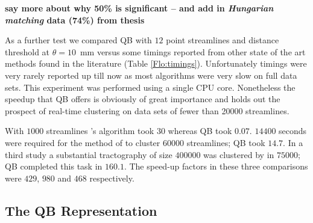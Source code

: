 \documentclass{bioinfo}
\begin{document}
\textbf{say more about why 50\% is significant -- and add in
  \textit{Hungarian matching} data (74\%) from thesis}

As a further test we compared QB with $12$ point streamlines and
distance threshold at $\theta=10$~mm versus some timings reported from
other state of the art methods found in the literature (Table
\ref{Flo:timings}). Unfortunately timings were very rarely reported up
till now as most algorithms were very slow on full data sets. This
experiment was performed using a single CPU core. Nonetheless the
speedup that QB offers is obviously of great importance and holds out
the prospect of real-time clustering on data sets of fewer than
\num{20000} streamlines. 

With $\num{1000}$ streamlines \citet{wang2010tractography}'s algorithm
took $30$ whereas QB took $0.07$.  $\num{14400}$ seconds were required
for the method of \citet{wang2010tractography} to cluster $\num{60000}$
streamlines; QB took $14.7$.  In a third study a substantial
tractography of size $\num{400000}$ was clustered by \citet{Visser2010}
in $\num{75000}$; QB completed this task in $160.1$. The speed-up
factors in these three comparisons were $429$, $980$ and $468$
respectively.


\subsection{The QB Representation\label{QB_Representation}}
\end{document}
